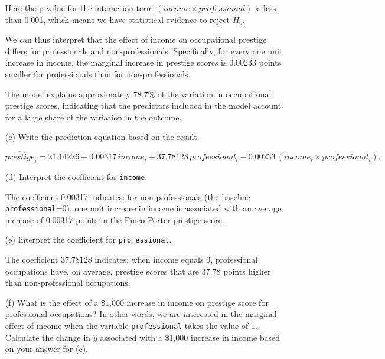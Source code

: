 \documentclass[12pt,letterpaper]{article}
\begin{document}
\begin{enumerate}
		\begin{table}[H] 
			\centering
			\label{tab:interaction}
			
		\end{table}
		
		Here the p-value for the interaction term $(income \times professional)$ is less than 0.001, which means we have statistical evidence to reject $H_0$.
		
		We can thus interpret that the effect of income on occupational prestige differs for professionals and non-professionals. Specifically, for every one unit increase in income, the marginal increase in prestige scores is 0.00233 points smaller for professionals than for non-professionals.
		
		The model explains approximately 78.7\% of the variation in occupational prestige scores, indicating that the predictors included in the model account for a large share of the variation in the outcome.
		
		\item [(c)] Write the prediction equation based on the result.
		
		\vspace{.3cm}
		\[
		\widehat{prestige}_i = 21.14226 + 0.00317\,income_i + 37.78128\,professional_i - 0.00233\,(income_i \times professional_i).
		\]
		
		\item [(d)] Interpret the coefficient for \texttt{income}.
		
		\vspace{.3cm}
		The coefficient 0.00317 indicates: for non-professionals (the baseline \texttt{professional}=0), one unit increase in income is associated with an average increase of 0.00317 points in the Pineo-Porter prestige score.
		
		\item [(e)] Interpret the coefficient for \texttt{professional}.
		
		\vspace{.3cm}
		The coefficient 37.78128 indicates: when income equals 0, professional occupations have, on average, prestige scores that are 37.78 points higher than non-professional occupations.
		
		\item [(f)] What is the effect of a \$1,000 increase in income on prestige score for professional occupations? In other words, we are interested in the marginal effect of income when the variable \texttt{professional} takes the value of $1$. Calculate the change in $\hat{y}$ associated with a \$1,000 increase in income based on your answer for (c).
		

\end{enumerate}
\end{document}
